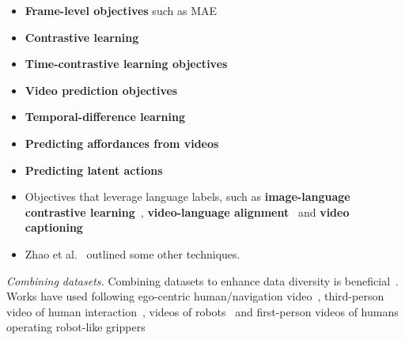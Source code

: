 \begin{itemize}
    \item \textbf{Frame-level objectives} such as \ac{MAE}~\cite{Radosavovic2022RealWorldRL}
    \item \textbf{Contrastive learning}~\cite{Jing2023ExploringVP, Chen2021AnES}
    \item \textbf{Time-contrastive learning objectives}~\cite{Ma2023LIVLR, Ma2022VIPTU, Nair2022R3MAU}
    \item \textbf{Video prediction objectives}~\cite{He2024LearningAA, Jang2024VisualRL, Wu2023UnleashingLV}
    \item \textbf{Temporal-difference learning}~\cite{Bhateja2023RoboticOR}
    \item \textbf{Predicting affordances from videos}~\cite{Bahl2023AffordancesFH}
    \item \textbf{Predicting latent actions}~\cite{Schmidt2023LearningTA}
    \item Objectives that leverage language labels, such as \textbf{image-language contrastive learning}~\cite{Ma2023LIVLR}, \textbf{video-language alignment}~\cite{Nair2022R3MAU} and \textbf{video captioning}~\cite{Karamcheti2023LanguageDrivenRL}
    \item Zhao et al.~\cite{Zhao2022WhatMR} outlined some other techniques.
\end{itemize}

\textit{Combining datasets.} Combining datasets to enhance data diversity is beneficial~\cite{Jing2023ExploringVP, Majumdar2023WhereAW, Dasari2023AnUL, Radosavovic2022RealWorldRL}. 
Works have used following ego-centric human/navigation video~\cite{Nair2022R3MAU, Ma2023LIVLR, Karamcheti2023LanguageDrivenRL, Majumdar2023WhereAW}, third-person video of human interaction~\cite{Radosavovic2022RealWorldRL, Shan2020UnderstandingHH, Miech2019HowTo100MLA}, videos of robots~\cite{Dasari2023AnUL} and first-person videos of humans operating robot-like grippers~\cite{Shafiullah2023OnBR}








